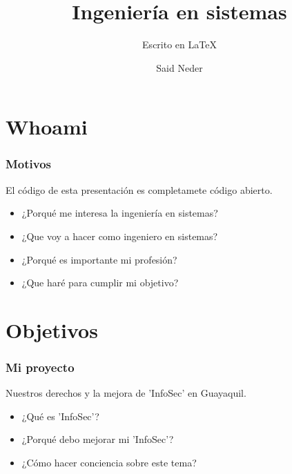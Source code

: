 \documentclass{beamer}
\title{Ingeniería en sistemas}
\author{Said Neder}
\subtitle{Escrito en \LaTeX}
\institute[\href{https://www.soler.edu.ec/}{Soler Lux Dei}]{Soler Lux Dei\\ \href{https://github.com/crazyc4t/presentacionppe}{\tiny https://github.com/crazyc4t/presentacionppe}}
\begin{document}
\maketitle

\section{Whoami}

\begin{frame}
\frametitle{Motivos}

El código de esta presentación es completamete código abierto.

\begin{itemize}
\item ¿Porqué me interesa la ingeniería en sistemas?
\item ¿Que voy a hacer como ingeniero en sistemas?
\item ¿Porqué es importante mi profesión?
\item ¿Que haré para cumplir mi objetivo?
\end{itemize}

\end{frame}

\section{Objetivos}

\begin{frame}
\frametitle{Mi proyecto}

Nuestros derechos y la mejora de 'InfoSec' en Guayaquil.\\

\begin{itemize}
\item ¿Qué es 'InfoSec'?
\item ¿Porqué debo mejorar mi 'InfoSec'?
\item ¿Cómo hacer conciencia sobre este tema?
\end{itemize}

\end{frame}
\end{document}
